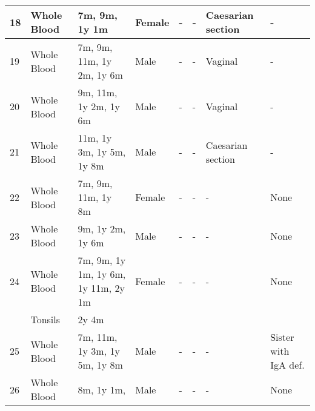 \documentclass[12pt]{article}
\begin{document}
\begin{landscape}
\begin{longtable}[c]{|l | l |p{4cm}|l|l|l|l|l|}
							18 & Whole Blood & 7m, 9m, 1y 1m                                            & Female & -         & -          & Caesarian section & -                    \\ \hline
							19 & Whole Blood & 7m, 9m, 11m, 1y 2m, 1y 6m                                & Male   & -         & -          & Vaginal           & -                    \\ \hline
							20 & Whole Blood & 9m, 11m, 1y 2m, 1y 6m                                    & Male   & -         & -          & Vaginal           & -                    \\ \hline
							21 & Whole Blood & 11m, 1y 3m, 1y 5m, 1y 8m                                 & Male   & -         & -          & Caesarian section & -                    \\ \hline
							22 & Whole Blood & 7m, 9m, 11m, 1y 8m                                       & Female & -         & -          & -                 & None                 \\ \hline
							23 & Whole Blood & 9m, 1y 2m, 1y 6m                                         & Male   & -         & -          & -                 & None                 \\ \hline
							24 & Whole Blood & 7m, 9m, 1y 1m, 1y 6m, 1y 11m, 2y 1m                      & Female & -         & -          & -                 & None                 \\
							& Tonsils     & 2y 4m                                                    &        &           &            &                   &  \\ \hline
							25 & Whole Blood & 7m, 11m, 1y 3m, 1y 5m, 1y 8m                             & Male   & -         & -          & -                 & Sister with IgA def. \\ \hline
							26 & Whole Blood & 8m, 1y 1m,                                               & Male   & -         & -          & -                 & None
						\end{longtable}
					\end{landscape}	
%
				
	
	
	
%	
%	
	
	
	
\end{document}
